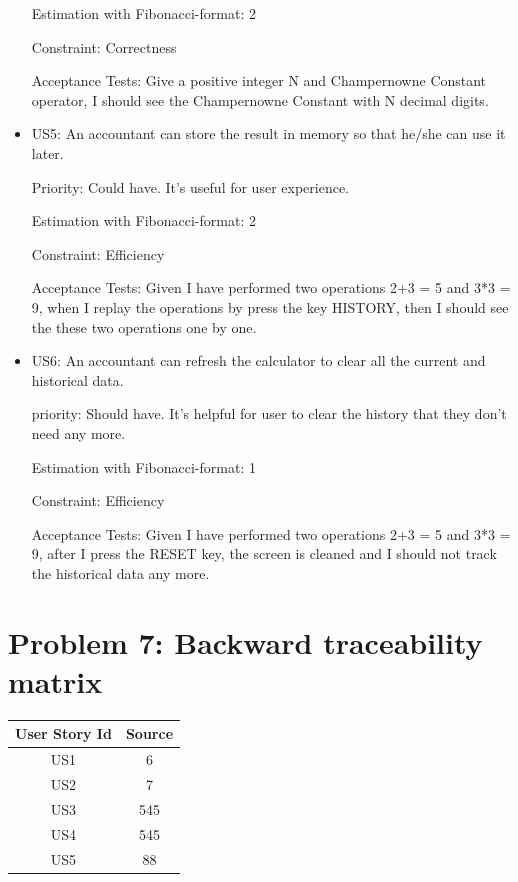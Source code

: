 \documentclass[10pt]{article}
\begin{document}
\begin{itemize}
    Estimation with Fibonacci-format: 2
    
    Constraint: Correctness
    
    Acceptance Tests: Give a positive integer N and Champernowne Constant operator, I should see the  Champernowne Constant with N decimal digits.
    
    \item US5: An accountant can store the result in memory so that he/she can use it later.
    
    Priority: Could have. It's useful for user experience.
    
    Estimation with Fibonacci-format: 2
    
    Constraint: Efficiency
    
    Acceptance Tests: Given I have performed two operations 2+3 = 5 and 3*3 = 9, when I replay the operations by press the key HISTORY, then I should see the these two operations one by one.
    
    \item US6: An accountant can refresh the calculator to clear all the current and historical data.
    
    priority: Should have. It's helpful for user to clear the history that they don't need any more.
    
    Estimation with Fibonacci-format: 1
    
    Constraint: Efficiency
    
    Acceptance Tests: Given I have performed two operations 2+3 = 5 and 3*3 = 9, after I press the RESET key, the screen is cleaned and I should not track the historical data any more.
\end{itemize}

\section{Problem 7: Backward traceability matrix}
\begin{center}
 \begin{tabular}{||c c||} 
 \hline
 User Story Id & Source \\ [0.5ex] 
 \hline\hline
 US1 & 6   \\ 
 \hline
 US2 & 7  \\
 \hline
 US3 & 545 \\
 \hline
 US4 & 545  \\
 \hline
 US5 & 88   \\ [1ex] 
 \hline
\end{tabular}
\end{center}
\end{document}
